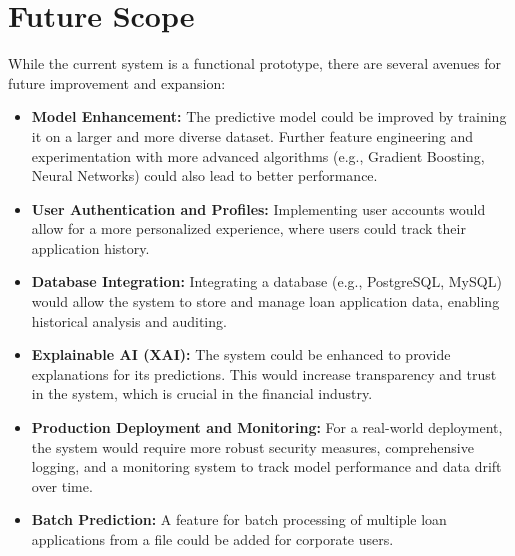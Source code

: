 \documentclass{report}
\begin{document}
\section{Future Scope}
While the current system is a functional prototype, there are several avenues for future improvement and expansion:
\begin{itemize}
    \item \textbf{Model Enhancement:} The predictive model could be improved by training it on a larger and more diverse dataset. Further feature engineering and experimentation with more advanced algorithms (e.g., Gradient Boosting, Neural Networks) could also lead to better performance.
    \item \textbf{User Authentication and Profiles:} Implementing user accounts would allow for a more personalized experience, where users could track their application history.
    \item \textbf{Database Integration:} Integrating a database (e.g., PostgreSQL, MySQL) would allow the system to store and manage loan application data, enabling historical analysis and auditing.
    \item \textbf{Explainable AI (XAI):} The system could be enhanced to provide explanations for its predictions. This would increase transparency and trust in the system, which is crucial in the financial industry.
    \item \textbf{Production Deployment and Monitoring:} For a real-world deployment, the system would require more robust security measures, comprehensive logging, and a monitoring system to track model performance and data drift over time.
    \item \textbf{Batch Prediction:} A feature for batch processing of multiple loan applications from a file could be added for corporate users.
\end{itemize}
\end{document}
